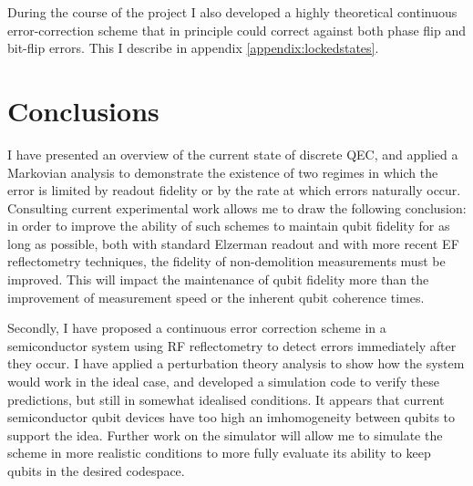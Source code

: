\documentclass{report}
\begin{document}
During the course of the project I also developed a highly theoretical continuous error-correction scheme that in principle could correct against both phase flip and bit-flip errors. This I describe in appendix \ref{appendix:lockedstates}.

\chapter{Conclusions}
I have presented an overview of the current state of discrete QEC, and applied a Markovian analysis to demonstrate the existence of two regimes in which the error is limited by readout fidelity or by the rate at which errors naturally occur. Consulting current experimental work allows me to draw the following conclusion: in order to improve the ability of such schemes to maintain qubit fidelity for as long as possible, both with standard Elzerman readout and with more recent EF reflectometry techniques, the fidelity of non-demolition measurements must be improved. This will impact the maintenance of qubit fidelity more than the improvement of measurement speed or the inherent qubit coherence times.

Secondly, I have proposed a continuous error correction scheme in a semiconductor system using RF reflectometry to detect errors immediately after they occur. I have applied a perturbation theory analysis to show how the system would work in the ideal case, and developed a simulation code to verify these predictions, but still in somewhat idealised conditions. It appears that current semiconductor qubit devices have too high an imhomogeneity between qubits to support the idea. Further work on the simulator will allow me to simulate the scheme in more realistic conditions to more fully evaluate its ability to keep qubits in the desired codespace.
\end{document}

